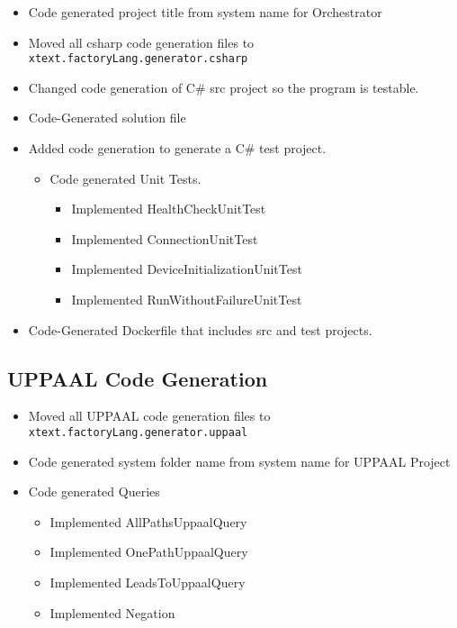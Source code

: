 \begin{itemize}
\item
  Code generated project title from system name for Orchestrator
\item
  Moved all csharp code generation files to
  \texttt{xtext.factoryLang.generator.csharp}
\item
  Changed code generation of C\# src project so the program is testable.
\item
  Code-Generated solution file
\item
  Added code generation to generate a C\# test project.

  \begin{itemize}
  \item
    Code generated Unit Tests.

    \begin{itemize}
    \item
      Implemented HealthCheckUnitTest
    \item
      Implemented ConnectionUnitTest
    \item
      Implemented DeviceInitializationUnitTest
    \item
      Implemented RunWithoutFailureUnitTest
    \end{itemize}
  \end{itemize}
\item
  Code-Generated Dockerfile that includes src and test projects.
\end{itemize}

\hypertarget{uppaal-code-generation}{%
\subsection{UPPAAL Code Generation}\label{uppaal-code-generation}}

\begin{itemize}
\item
  Moved all UPPAAL code generation files to
  \texttt{xtext.factoryLang.generator.uppaal}
\item
  Code generated system folder name from system name for UPPAAL Project
\item
  Code generated Queries

  \begin{itemize}
  \item
    Implemented AllPathsUppaalQuery
  \item
    Implemented OnePathUppaalQuery
  \item
    Implemented LeadsToUppaalQuery
  \item
    Implemented Negation
  \end{itemize}
\end{itemize}